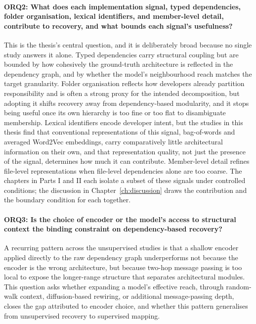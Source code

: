 \paragraph{ORQ2: What does each implementation signal, typed dependencies, folder organisation, lexical identifiers, and member-level detail, contribute to recovery, and what bounds each signal's usefulness?}
This is the thesis's central question, and it is deliberately broad because no single study answers it alone. Typed dependencies carry structural coupling but are bounded by how cohesively the ground-truth architecture is reflected in the dependency graph, and by whether the model's neighbourhood reach matches the target granularity. Folder organisation reflects how developers already partition responsibility and is often a strong proxy for the intended decomposition, but adopting it shifts recovery away from dependency-based modularity, and it stops being useful once its own hierarchy is too fine or too flat to disambiguate membership. Lexical identifiers encode developer intent, but the studies in this thesis find that conventional representations of this signal, bag-of-words and averaged Word2Vec embeddings, carry comparatively little architectural information on their own, and that representation quality, not just the presence of the signal, determines how much it can contribute. Member-level detail refines file-level representations when file-level dependencies alone are too coarse. The chapters in Parts I and II each isolate a subset of these signals under controlled conditions; the discussion in Chapter~\ref{ch:discussion} draws the contribution and the boundary condition for each together.

\paragraph{ORQ3: Is the choice of encoder or the model's access to structural context the binding constraint on dependency-based recovery?}
A recurring pattern across the unsupervised studies is that a shallow encoder applied directly to the raw dependency graph underperforms not because the encoder is the wrong architecture, but because two-hop message passing is too local to expose the longer-range structure that separates architectural modules. This question asks whether expanding a model's effective reach, through random-walk context, diffusion-based rewiring, or additional message-passing depth, closes the gap attributed to encoder choice, and whether this pattern generalises from unsupervised recovery to supervised mapping.

